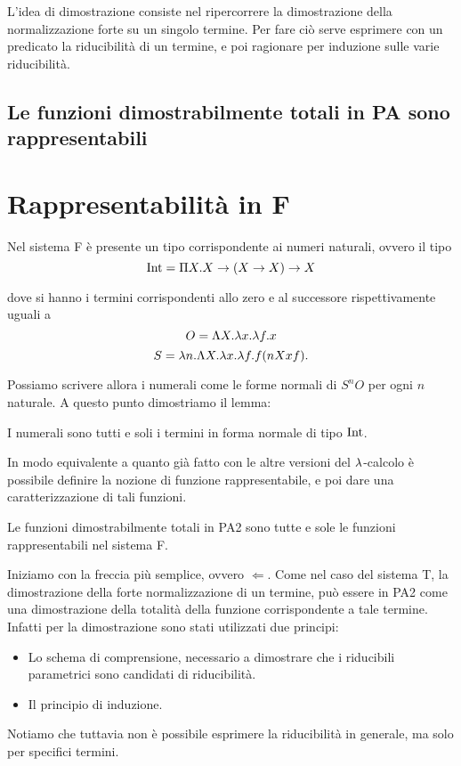 \documentclass[]{marticle}
\begin{document}
L'idea di dimostrazione consiste nel ripercorrere la dimostrazione della
normalizzazione forte su un singolo termine. Per fare ci\`o serve esprimere con
un predicato la riducibilit\`a di un termine, e poi ragionare per induzione
sulle varie riducibilit\`a.

\subsection{Le funzioni dimostrabilmente totali in PA sono rappresentabili}

\section{Rappresentabilit\`a in F}

Nel sistema F \`e presente un tipo corrispondente ai numeri naturali, ovvero il
tipo
\[
    \text{Int} = \Pi X. X \rightarrow (X \rightarrow X) \rightarrow X
\]

dove si hanno i termini corrispondenti allo zero e al successore rispettivamente
uguali a
\[
    O = \Lambda X. \lambda x. \lambda f. x
\]
\[
    S = \lambda n. \Lambda X. \lambda x. \lambda f. f (nXxf).
\]

Possiamo scrivere allora i numerali come le forme normali di $S^nO$ per ogni $n$
naturale. A questo punto dimostriamo il lemma:

\begin{block}[Lemma]
    I numerali sono tutti e soli i termini in forma normale di tipo $\text{Int}$. 
\end{block}


In modo equivalente a quanto gi\`a fatto con le altre versioni del $\lambda$-calcolo
\`e possibile definire la nozione di funzione rappresentabile, e poi dare una
caratterizzazione di tali funzioni.

\begin{block}[Teorema]
    Le funzioni dimostrabilmente totali in PA2 sono tutte e sole le
    funzioni rappresentabili nel sistema F.
\end{block}

Iniziamo con la freccia pi\`u semplice, ovvero $\Leftarrow$. Come nel caso del
sistema T, la dimostrazione della forte normalizzazione di un termine, pu\`o
essere  in PA2 come una dimostrazione della totalit\`a della
funzione corrispondente a tale termine. Infatti per la dimostrazione sono stati
utilizzati due principi:
\begin{itemize}
    \item Lo schema di comprensione, necessario a dimostrare che i riducibili
        parametrici sono candidati di riducibilit\`a. 
    \item Il principio di induzione.
\end{itemize}
Notiamo che tuttavia non \`e possibile esprimere la riducibilit\`a in generale,
ma solo per specifici termini.
\end{document}
